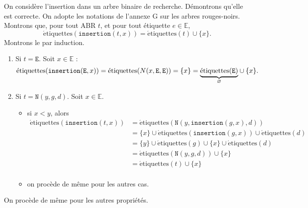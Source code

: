 \documentclass[a4paper]{article}
\begin{document}
	On considère l'insertion dans un arbre binaire de recherche.
	Démontrons qu'elle est correcte.
	On adopte les notations de l'annexe G sur les arbres rouges-noirs.
	Montrons que, pour tout ABR $t$, et pour tout étiquette $e \in \mathds{E}$, 
	\[
		\mathrm{\acute{e}tiquettes}(\texttt{insertion}(t, x)) = \mathrm{\acute{e}tiquettes}(t) \cup \{x\}
	.\]
	Montrons le par induction.
	\begin{enumerate}
		\item Si $t = \texttt{E}$. Soit $x \in \mathds{E}$ : \[
				\mathrm{\acute{e}tiquettes}(\texttt{insertion}(\texttt{E},x)) = \mathrm{\acute{e}tiquettes}(N(x, \texttt{E},\texttt{E})) = \{x\} = \mathord{\underbrace{\mathrm{\acute{e}tiquettes}(\texttt{E})}_{\varnothing}} \cup \{x\}
			.\]
		\item Si $t = \texttt{N}(y, g, d)$. Soit $x \in \mathds{E}$.
			\begin{itemize}
				\item si $x < y$, alors
					\begin{align*}
						\mathrm{\acute{e}tiquettes}(\texttt{insertion}(t,x))
						&= \mathrm{\acute{e}tiquettes}(\texttt{N}(y, \texttt{insertion}(g,x), d)) \\
						&= \{x\} \cup \mathrm{\acute{e}tiquettes}(\texttt{insertion}(g,x)) \cup \mathrm{\acute{e}tiquettes}(d) \\
						&= \{y\}  \cup \mathrm{\acute{e}tiquettes}(g) \cup \{x\} \cup \mathrm{\acute{e}tiquettes}(d) \\
						&= \mathrm{\acute{e}tiquettes}(\texttt{N}(y,g,d)) \cup \{x\} \\
						&= \mathrm{\acute{e}tiquettes}(t) \cup \{x\} \\
					\end{align*}
				\item on procède de même pour les autres cas.
			\end{itemize}
	\end{enumerate}
	On procède de même pour les autres propriétés.
\end{document}
